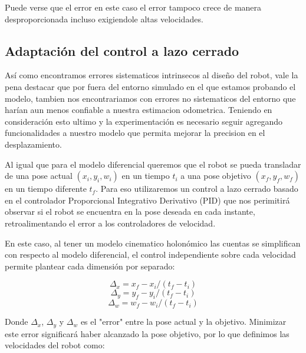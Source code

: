 Puede verse que el error en este caso el error tampoco crece de manera desproporcionada incluso exigiendole altas velocidades.



\subsection{Adaptación del control a lazo cerrado}

Así como encontramos errores sistematicos intrinsecos al diseño del robot, vale la pena destacar que por fuera del entorno simulado en el que estamos probando el modelo, tambien nos encontrariamos con errores no sistematicos del entorno que harían aun menos confiable a nuestra estimacion odometrica. Teniendo en consideración esto ultimo y la experimentación es necesario seguir agregando funcionalidades a nuestro modelo que permita mejorar la precision en el desplazamiento. 

Al igual que para el modelo diferencial queremos que el robot se pueda transladar de una pose actual $(x_i,y_i,w_i)$ en un tiempo $t_i$ a una pose objetivo $(x_f,y_f,w_f)$ en un tiempo diferente $t_f$. Para eso utilizaremos un control a lazo cerrado basado en el controlador Proporcional Integrativo Derivativo (PID) que nos perimitirá observar si el robot se encuentra en la pose deseada en cada instante, retroalimentando el error a los controladores de velocidad.

En este caso, al tener un modelo cinematico holonómico las cuentas se simplifican con respecto al modelo diferencial, el control independiente sobre cada velocidad permite plantear cada  dimensión por separado:

$$\Delta_x = x_f - x_i / (t_f - t_i)$$
$$\Delta_y = y_f - y_i / (t_f - t_i)$$
$$\Delta_w = w_f - w_i / (t_f - t_i)$$

Donde $\Delta_x$, $\Delta_y$ y $\Delta_w$ es el "error" entre la pose actual y la objetivo. Minimizar este error significará haber alcanzado la pose objetivo, por lo que definimos las velocidades del robot como:


